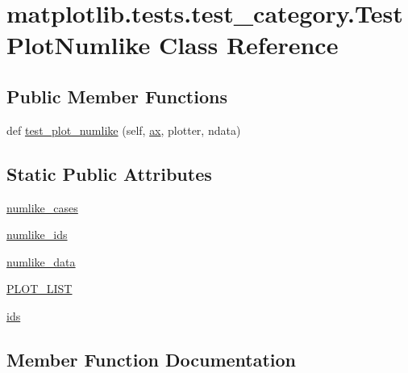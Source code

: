 \hypertarget{classmatplotlib_1_1tests_1_1test__category_1_1TestPlotNumlike}{}\section{matplotlib.\+tests.\+test\+\_\+category.\+Test\+Plot\+Numlike Class Reference}
\label{classmatplotlib_1_1tests_1_1test__category_1_1TestPlotNumlike}
\subsection*{Public Member Functions}
\begin{DoxyCompactItemize}
\item 
def \hyperlink{classmatplotlib_1_1tests_1_1test__category_1_1TestPlotNumlike_a069687dcc2be7111dd405cd84cb55600}{test\+\_\+plot\+\_\+numlike} (self, \hyperlink{namespacematplotlib_1_1tests_1_1test__category_ac4a78c2ee1d8720275b6d0ca5dee3c1c}{ax}, plotter, ndata)
\end{DoxyCompactItemize}
\subsection*{Static Public Attributes}
\begin{DoxyCompactItemize}
\item 
\hyperlink{classmatplotlib_1_1tests_1_1test__category_1_1TestPlotNumlike_ac540c5d72318409a904dbeda6bbc70c3}{numlike\+\_\+cases}
\item 
\hyperlink{classmatplotlib_1_1tests_1_1test__category_1_1TestPlotNumlike_ab9dcd90a344cfbe6ecb44688763eeddc}{numlike\+\_\+ids}
\item 
\hyperlink{classmatplotlib_1_1tests_1_1test__category_1_1TestPlotNumlike_a3a3848a5612b76ac1de0f16764133d17}{numlike\+\_\+data}
\item 
\hyperlink{classmatplotlib_1_1tests_1_1test__category_1_1TestPlotNumlike_a356d93bf3f8c48ce8a137f6b1c230ba1}{P\+L\+O\+T\+\_\+\+L\+I\+ST}
\item 
\hyperlink{classmatplotlib_1_1tests_1_1test__category_1_1TestPlotNumlike_ae9078cb48bfb2a206ae3c8e44dcdbc8c}{ids}
\end{DoxyCompactItemize}


\subsection{Member Function Documentation}
\mbox{\label{classmatplotlib_1_1tests_1_1test__category_1_1TestPlotNumlike_a069687dcc2be7111dd405cd84cb55600}} 
